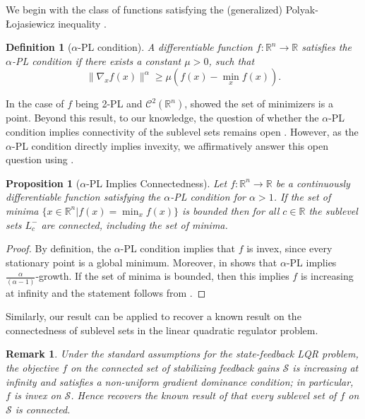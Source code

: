 \documentclass{article}
\newtheorem{definition}{Definition}[section]
\newtheorem{prop}{Proposition}
\newtheorem{rem}{Remark}
\newcommand{\R}{\mathbb{R}}
\begin{document}
We begin with the class of functions satisfying the (generalized) Polyak-\L{}ojasiewicz inequality \citep{Polyak1963Gradient,Lojasiewicz1963Une}.


\begin{definition}[$\alpha$-PL condition]
\label{def:aPL}
    A differentiable function \(f:\R^n \to \R \) satisfies the $\alpha$-PL condition if there exists a constant $\mu>0$, such that
    \[
    \|\nabla_x f(x)\|^\alpha \geq \mu \left(f(x) - \min_x f(x)\right).
    \]
\end{definition}
In the case of $f$ being 2-PL and $\mathcal{C}^2(\R^n)$, \citet{Criscitiello2025} showed the set of minimizers is a point. 
Beyond this result, to our knowledge, the question of whether the $\alpha$-PL condition implies connectivity of the sublevel sets remains open \citep{Zeng2023Connected}.  However, as the $\alpha$-PL condition directly implies invexity, we affirmatively answer this open question using .

\begin{prop}[$\alpha$-PL Implies Connectedness]
    \label{prop:PLconnect}
    Let $f:\R^n \rightarrow \R $ be a continuously differentiable function satisfying the $\alpha$-PL condition for $\alpha>1$. If the set of minima $\{x\in \R^n|f(x)=\min_x f(x)\}$ is bounded then for all $c\in \R$ the sublevel sets $ L^-_c$ are connected, including the set of minima.    
\end{prop}

\begin{proof}
    By definition, the $\alpha$-PL condition implies that $f$ is invex, since every stationary point is a global minimum. Moreover,  in  shows that $\alpha$-PL implies $\frac{\alpha}{\left(\alpha-1\right)}$-growth. If the set of minima is bounded, then this implies $f$ is increasing at infinity and the statement follows from .
\end{proof}

Similarly, our result can be applied to recover a known result on the connectedness of sublevel sets in the linear quadratic regulator problem.

\begin{rem}
Under the standard assumptions for the state-feedback LQR problem, the objective $f$ on the connected set of stabilizing feedback gains $\mathcal S$ is increasing at infinity and satisfies a non-uniform gradient dominance condition; in particular, $f$ is invex on $\mathcal S$. Hence  recovers the known result of \citet{Fatkhullin2021Optimizing} that every sublevel set of $f$ on $\mathcal S$ is connected.
\end{rem}
\end{document}
